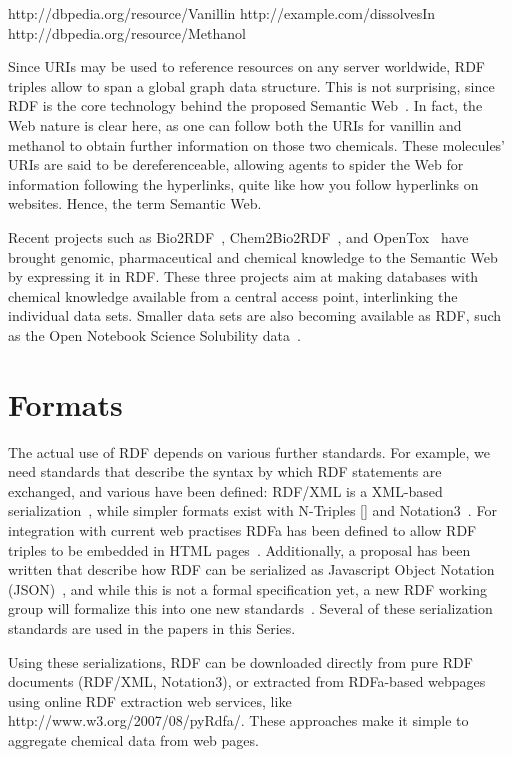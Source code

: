 \documentclass[10pt]{bmc_article}
\newenvironment{bmcformat}{\begin{raggedright}\baselineskip20pt\sloppy\setboolean{publ}{false}}{\end{raggedright}\baselineskip20pt\sloppy}
\begin{document}
\begin{bmcformat}
http://dbpedia.org/resource/Vanillin http://example.com/dissolvesIn http://dbpedia.org/resource/Methanol

Since URIs may be used to reference resources on any server worldwide, RDF triples allow to span a global graph data structure. 
This is not surprising, since RDF is the core technology behind the proposed Semantic Web~\cite{BER2001}. In fact, the Web
nature is clear here, as one can follow both the URIs for vanillin and methanol to
obtain further information on those two chemicals. These molecules' URIs are said to be
dereferenceable, allowing agents to spider the Web for information following
the hyperlinks, quite like how you follow hyperlinks on websites. Hence, the term Semantic Web.

Recent projects such as Bio2RDF~\cite{BEL2008}, Chem2Bio2RDF~\cite{CHE2010},
and OpenTox~\cite{Hardy2010} have brought genomic, pharmaceutical and
chemical knowledge to the Semantic Web by expressing it in RDF.
These three projects aim at making databases with chemical knowledge
available from a central access point, interlinking the individual
data sets. Smaller data sets are also becoming available as RDF, such as
the Open Notebook Science Solubility data~\cite{citeulike:5441072}. 

\section{Formats}

The actual use of RDF depends on various further standards. For example, we need
standards that describe the syntax by which RDF statements are exchanged, and
various have been defined: RDF/XML is a XML-based serialization~\cite{Beckett2004}, while
simpler formats exist with N-Triples [] and Notation3~\cite{BernersLee2006}. For integration with
current web practises RDFa has been defined to allow RDF triples to be embedded
in HTML pages~\cite{RDFA2008}. Additionally, a proposal has been written that
describe how RDF can be serialized as Javascript Object Notation (JSON)~\cite{Alexander2008}, and
while this is not a formal specification yet,
a new RDF working group will formalize this into one new standards~\cite{Herman2010}. Several
of these serialization standards are used in the papers in this Series.

Using these serializations, RDF can be downloaded directly from pure RDF
documents (RDF/XML, Notation3), or extracted from RDFa-based webpages using
online RDF extraction web services, like http://www.w3.org/2007/08/pyRdfa/.
These approaches make it simple to aggregate chemical data from web pages.


\end{bmcformat}
\end{document}
